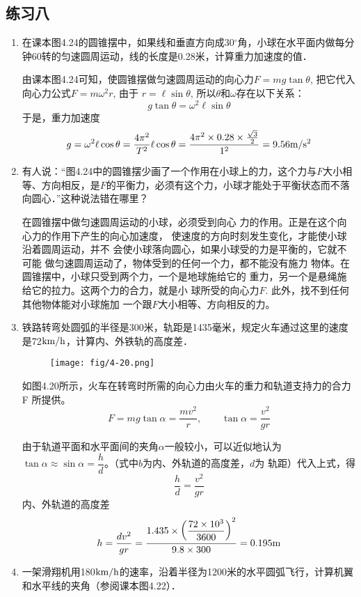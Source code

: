 \subsection{练习八}
\begin{enumerate}
	\item 在课本图4.24的圆锥摆中，如果线和垂直方向成30$^\circ$角，小球在水平面内做每分钟60转的匀速圆周运动，线的长度是0.28米，计算重力加速度的值．

    \begin{solution}
        由课本图4.24可知，使圆锥摆做匀速圆周运动的向心力$F=mg\tan\theta$, 把它代入向心力公式$F=m\omega^2r$, 由于
        $r=\ell\sin\theta$, 所以$\theta$和$\omega$存在以下关系：
\[g\tan\theta=\omega^2\ell\sin\theta\]
于是，重力加速度
\[g=\omega^2\ell\cos\theta=\frac{4\pi^2}{T^2}\ell\cos\theta=\frac{4\pi^2\times 0.28\times \frac{\sqrt{3}}{2}}{1^2}=9.56\text{m}/\text{s}^2\]
    \end{solution}
\item 有人说：“图4.24中的圆锥摆少画了一个作用在小球上的力，这个力与$F$大小相等、方向相反，是$F$的平衡力，必须有这个力，小球才能处于平衡状态而不落向圆心．”这种说法错在哪里？

\begin{solution}
    在圆锥摆中做匀速圆周运动的小球，必须受到向心
    力的作用。正是在这个向心力的作用下产生的向心加速度，
    使速度的方向时刻发生变化，才能使小球沿着圆周运动，并不
    会使小球落向圆心，如果小球受的力是平衡的，它就不可能
    做匀速圆周运动了，物体受到的任何一个力，都不能没有施力
    物体。在圆锥摆中，小球只受到两个力，一个是地球施给它的
    重力，另一个是悬绳施给它的拉力。这两个力的合力，就是小
    球所受的向心力$F$. 此外，找不到任何其他物体能对小球施加
    一个跟$F$大小相等、方向相反的力。
\end{solution}
\item 铁路转弯处圆弧的半径是300米，轨距是1435毫米，规定火车通过这里的速度是72$\text{km}/\text{h}$，计算内、外铁轨的高度差．
\begin{figure}[htp]
    \centering
    \texttt{[image: fig/4-20.png]}
    \caption{}
    \end{figure}

\begin{solution}
    如图4.20所示，火车在转弯时所需的向心力由火车的重力和轨道支持力的合力F
所提供。
\[F=mg\tan\alpha=\frac{mv^2}{r},\qquad \tan\alpha=\frac{v^2}{gr}\]

由于轨道平面和水平面间的夹角$\alpha$一般较小，可以近似地认为$\tan\alpha\approx \sin\alpha=\dfrac{h}{d}$。（式中$b$为内、外轨道的高度差，$d$为
轨距）代入上式，得
\[\frac{h}{d}=\frac{v^2}{gr}\]
内、外轨道的高度差
\[h=\frac{dv^2}{gr}=\frac{1.435\times\left(\dfrac{72\times 10^3}{3600}\right)^2}{9.8\times 300}=0.195{\rm m}\]
\end{solution}
\item 一架滑翔机用180$\text{km}/\text{h}$的速率，沿着半径为1200米的水平圆弧飞行，计算机翼和水平线的夹角（参阅课本图4.22）．


\end{enumerate}
